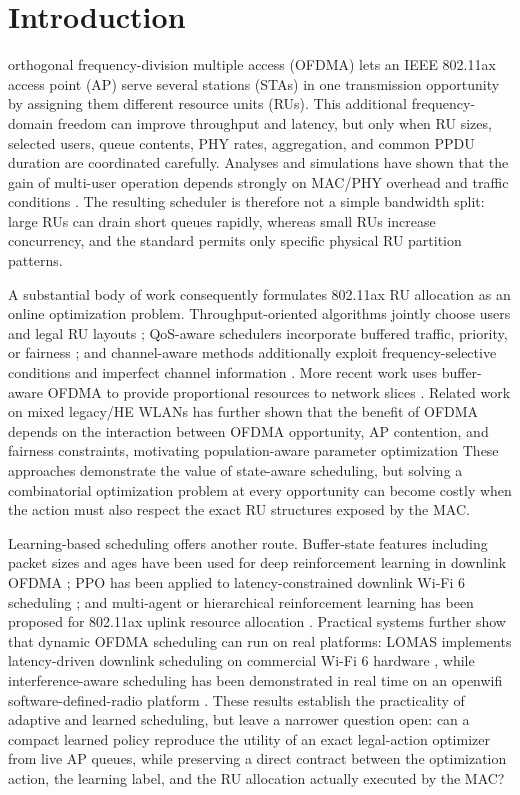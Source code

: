 \documentclass[lettersize,journal]{IEEEtran}
\begin{document}
\section{Introduction}
 orthogonal frequency-division multiple access (OFDMA)
lets an IEEE 802.11ax access point (AP) serve several stations (STAs) in one
transmission opportunity by assigning them different resource units (RUs).
This additional frequency-domain freedom can improve throughput and latency,
but only when RU sizes, selected users, queue contents, PHY rates, aggregation,
and common PPDU duration are coordinated carefully. Analyses and simulations
have shown that the gain of multi-user operation depends strongly on MAC/PHY
overhead and traffic conditions \cite{bellalta2019ap,daldoul2020performance,
avallone2021ofdma,magrin2023performance}. The resulting scheduler is therefore
not a simple bandwidth split: large RUs can drain short queues rapidly, whereas
small RUs increase concurrency, and the standard permits only specific physical
RU partition patterns.

A substantial body of work consequently formulates 802.11ax RU allocation as
an online optimization problem. Throughput-oriented algorithms jointly choose
users and legal RU layouts \cite{wang2020efficient,mmru2020}; QoS-aware
schedulers incorporate buffered traffic, priority, or fairness
\cite{filoso2020qos,brahmi2023fair}; and channel-aware methods additionally
exploit frequency-selective conditions and imperfect channel information
\cite{tutelian2021frequency}. More recent work uses buffer-aware OFDMA to
provide proportional resources to network slices \cite{marrone2025slicing}. Related work on mixed legacy/HE WLANs has further shown that the benefit of OFDMA depends on the interaction between OFDMA opportunity, AP contention, and fairness constraints, motivating population-aware parameter optimization \cite{GIANG2026112793}
These approaches demonstrate the value of state-aware scheduling, but solving
a combinatorial optimization problem at every opportunity can become costly
when the action must also respect the exact RU structures exposed by the MAC.

Learning-based scheduling offers another route. Buffer-state features including
packet sizes and ages have been used for deep reinforcement learning in
downlink OFDMA \cite{bansbach2021buffer}; PPO has been applied to
latency-constrained downlink Wi-Fi 6 scheduling \cite{he2023timesensitive}; and
multi-agent or hierarchical reinforcement learning has been proposed for
802.11ax uplink resource allocation \cite{han2024multiagent,noh2024joint}.
Practical systems further show that dynamic OFDMA scheduling can run on real
platforms: LOMAS implements latency-driven downlink scheduling on commercial
Wi-Fi 6 hardware \cite{tai2025lomas}, while interference-aware scheduling has
been demonstrated in real time on an openwifi software-defined-radio platform
\cite{havinga2026cti}. These results establish the practicality of adaptive and
learned scheduling, but leave a narrower question open: can a compact learned
policy reproduce the utility of an exact legal-action optimizer from live AP
queues, while preserving a direct contract between the optimization action,
the learning label, and the RU allocation actually executed by the MAC?
\end{document}
